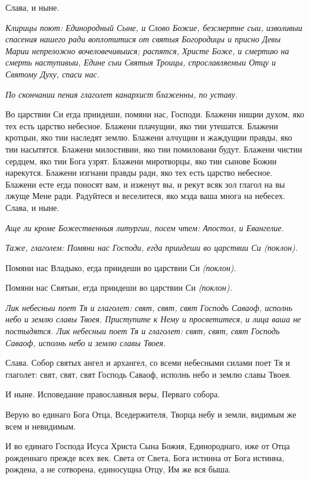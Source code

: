 Слава, и ныне.


\itshape Клирицы поют:\normalfont{} Единородный Сыне, и Слово Божие, безсмертне сыи, изволивыи спасения нашего ради воплотитися от святыя Богородицы и присно Девы Марии непреложно вочеловечивыися; распятся, Христе Боже, и смертию на смерть наступивыи, Едине сыи Святыя Троицы, спрославляемыи Отцу и Святому Духу, спаси нас.


\itshape По скончании пения глаголет канархист блаженны, по уставу.\normalfont{}


Во царствии Си егда приидеши, помяни нас, Господи. Блажени нищии духом, яко тех есть царство небесное. Блажени плачущии, яко тии утешатся. Блажени кротцыи, яко тии наследят землю. Блажени алчущии и жаждущии правды, яко тии насытятся. Блажени милостивии, яко тии помиловани будут. Блажени чистии сердцем, яко тии Бога узрят. Блажени миротворцы, яко тии сынове Божии нарекутся. Блажени изгнани правды ради, яко тех есть царство небесное. Блажени есте егда поносят вам, и изженут вы, и рекут всяк зол глагол на вы лжуще Мене ради. Радуйтеся и веселитеся, яко мзда ваша многа на небесех. Слава, и ныне.


\itshape Аще ли кроме Божественныя литургии, посем чтем:\normalfont{} Апостол, и Евангелие.


\itshape Таже, глаголем:\normalfont{} Помяни нас Господи, егда приидеши во царствии Си \itshape (поклон)\normalfont{}.


Помяни нас Владыко, егда приидеши во царствии Си \itshape (поклон)\normalfont{}.


Помяни нас Святыи, егда приидеши во царствии Си \itshape (поклон)\normalfont{}.


\itshape Лик небесныи поет Тя и глаголет:\normalfont{} свят, свят, свят Господь Саваоф, исполнь небо и землю славы Твоея. Приступите к Нему и просветитеся, и лица ваша не постыдятся. Лик небесныи поет Тя и глаголет: свят, свят, свят Господь Саваоф, исполнь небо и землю славы Твоея.


Слава. Собор святых ангел и архангел, со всеми небесными силами поет Тя и глаголет: свят, свят, свят Господь Саваоф, исполнь небо и землю славы Твоея.


И ныне. Исповедание православныя веры, Перваго собора.


Верую во единаго Бога Отца, Вседержителя, Творца небу и земли, видимым же всем и невидимым.


И во единаго Господа Исуса Христа Сына Божия, Единороднаго, иже от Отца рожденнаго прежде всех век. Света от Света, Бога истинна от Бога истинна, рождена, а не сотворена, единосущна Отцу, Им же вся быша.



